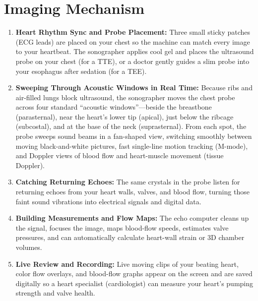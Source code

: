 \section{Imaging Mechanism}
\begin{enumerate}
\item \textbf{Heart Rhythm Sync and Probe Placement:} Three small sticky patches (ECG leads) are placed on your chest so the machine can match every image to your heartbeat. The sonographer applies cool gel and places the ultrasound probe on your chest (for a TTE), or a doctor gently guides a slim probe into your esophagus after sedation (for a TEE).
\item \textbf{Sweeping Through Acoustic Windows in Real Time:} Because ribs and air-filled lungs block ultrasound, the sonographer moves the chest probe across four standard ``acoustic windows''---beside the breastbone (parasternal), near the heart's lower tip (apical), just below the ribcage (subcostal), and at the base of the neck (suprasternal). From each spot, the probe sweeps sound beams in a fan-shaped view, switching smoothly between moving black-and-white pictures, fast single-line motion tracking (M-mode), and Doppler views of blood flow and heart-muscle movement (tissue Doppler).
\item \textbf{Catching Returning Echoes:} The same crystals in the probe listen for returning echoes from your heart walls, valves, and blood flow, turning those faint sound vibrations into electrical signals and digital data.
\item \textbf{Building Measurements and Flow Maps:} The echo computer cleans up the signal, focuses the image, maps blood-flow speeds, estimates valve pressures, and can automatically calculate heart-wall strain or 3D chamber volumes.
\item \textbf{Live Review and Recording:} Live moving clips of your beating heart, color flow overlays, and blood-flow graphs appear on the screen and are saved digitally so a heart specialist (cardiologist) can measure your heart's pumping strength and valve health.
\end{enumerate}

